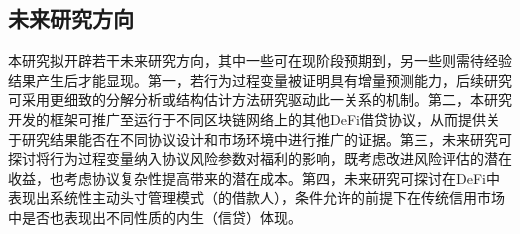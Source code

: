 \subsection{未来研究方向}

本研究拟开辟若干未来研究方向，其中一些可在现阶段预期到，另一些则需待经验结果产生后才能显现。第一，若行为过程变量被证明具有增量预测能力，后续研究可采用更细致的分解分析或结构估计方法研究驱动此一关系的机制。第二，本研究开发的框架可推广至运行于不同区块链网络上的其他DeFi借贷协议，从而提供关于研究结果能否在不同协议设计和市场环境中进行推广的证据。第三，未来研究可探讨将行为过程变量纳入协议风险参数对福利的影响，既考虑改进风险评估的潜在收益，也考虑协议复杂性提高带来的潜在成本。第四，未来研究可探讨在DeFi中表现出系统性主动头寸管理模式（的借款人），条件允许的前提下在传统信用市场中是否也表现出不同性质的内生（信贷）体现。
